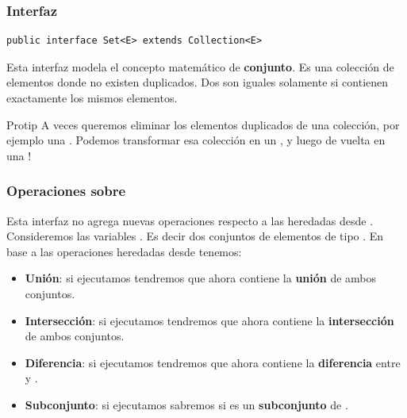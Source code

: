 \documentclass{beamer}
\begin{document}
\begin{frame}[fragile]
  \frametitle{Interfaz }

\begin{verbatim}
public interface Set<E> extends Collection<E>
\end{verbatim}

  Esta interfaz modela el concepto matemático de \textbf{conjunto}. Es
  una colección de elementos donde no existen duplicados. Dos
   son iguales solamente si contienen exactamente los
  mismos elementos.

  \begin{block}{Protip}
    A veces queremos eliminar los elementos duplicados de una
    colección, por ejemplo una . Podemos transformar esa
    colección en un , y luego de vuelta en una
    !
  \end{block}
  
\end{frame}

\begin{frame}[fragile]
  \frametitle{Operaciones sobre }

  Esta interfaz no agrega nuevas operaciones respecto a las heredadas
  desde . Consideremos las variables . Es decir dos conjuntos de elementos de tipo . En
  base a las operaciones heredadas desde  tenemos:

\begin{itemize}

\item \textbf{Unión}: si ejecutamos  tendremos
  que  ahora contiene la \textbf{unión} de ambos conjuntos.
 
\item \textbf{Intersección}: si ejecutamos 
  tendremos que  ahora contiene la \textbf{intersección} de
  ambos conjuntos.

\item \textbf{Diferencia}: si ejecutamos 
  tendremos que  ahora contiene la \textbf{diferencia} entre
   y .

\item \textbf{Subconjunto}: si ejecutamos 
  sabremos si  es un \textbf{subconjunto} de .
  
\end{itemize}
  
\end{frame}
\end{document}
